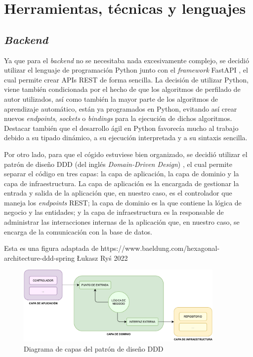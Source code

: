 \chapter{Herramientas, técnicas y lenguajes}
\label{chap:herramientas}
	
\section{\textit{Backend}}
\label{sec:herramientas_backend}

Ya que para el \textit{backend} no se necesitaba nada excesivamente complejo, se decidió utilizar el lenguaje de programación Python \cite{python} junto
con el \textit{framework} FastAPI \cite{fastapi}, el cual permite crear APIs REST de forma sencilla. La decisión de utilizar Python, viene también
condicionada por el hecho de que los algoritmos de perfilado de autor utilizados, así como también la mayor parte de los algoritmos de aprendizaje automático, 
están ya programados en Python, evitando así crear nuevos \textit{endpoints}, \textit{sockets} o \textit{bindings} para la ejecución de dichos algoritmos.
Destacar también que el desarrollo ágil en Python favorecía mucho al trabajo debido a su tipado dinámico, a su ejecución interpretada y a su sintaxis sencilla.

\bigskip
Por otro lado, para que el cógido estuviese bien organizado, se decidió utilizar el patrón de diseño DDD (del inglés \textit{Domain-Driven Design}) \cite{ddd}, el cual
permite separar el código en tres capas: la capa de aplicación, la capa de dominio y la capa de infraestructura. La capa de aplicación es la encargada de gestionar
la entrada y salida de la aplicación que, en nuestro caso, es el controlador que maneja los \textit{endpoints} REST; la capa de dominio es la que contiene la lógica
de negocio y las entidades; y la capa de infraestructura es la responsable de administrar las interacciones internas de la aplicación que, en nuestro
caso, se encarga de la comunicación con la base de datos.

\bigskip
Esta es una figura adaptada de https://www.baeldung.com/hexagonal-architecture-ddd-spring Łukasz Ryś 2022
\begin{figure}[H]
	\centering
	\includegraphics[width=0.9\textwidth]{diagramas/ddd.pdf}
	\caption{Diagrama de capas del patrón de diseño DDD}
	\label{fig:ddd}
\end{figure}

